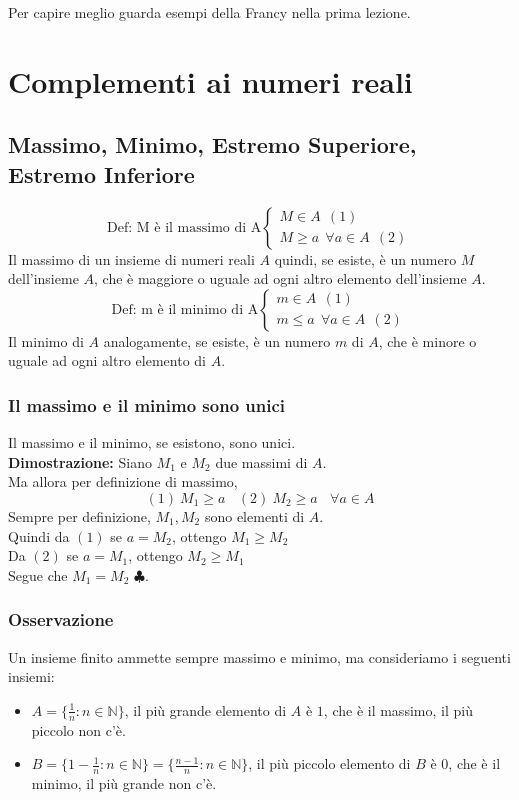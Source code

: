 \documentclass{article}
\begin{document}
Per capire meglio guarda esempi della Francy nella prima lezione.

\section{Complementi ai numeri reali}
\subsection{Massimo, Minimo, Estremo Superiore, Estremo Inferiore}
\[
    \text{Def: M è il massimo di A} \begin{cases}
        M \in A  \ \ (1) \\
        M \geq a \ \ \forall a \in A \ \ (2)
    \end{cases}
\]
Il massimo di un insieme di numeri reali $A$ quindi, se esiste, è un numero $M$
dell'insieme $A$, che è maggiore o uguale ad ogni altro elemento dell'insieme
$A$.
\[
    \text{Def: m è il minimo di A} \begin{cases}
        m \in A  \ \ (1) \\
        m \leq a \ \ \forall a \in A \ \ (2)
    \end{cases}
\]
Il minimo di $A$ analogamente, se esiste, è un numero $m$ di $A$, che è minore
o uguale ad ogni altro elemento di $A$.

\subsubsection{Il massimo e il minimo sono unici}
Il massimo e il minimo, se esistono, sono unici.\\ \textbf{Dimostrazione:}
Siano $M_1$ e $M_2$ due massimi di $A$.\\ Ma allora per definizione di massimo,
\[
    (1) \ M_1 \geq a \ \ \ \ (2) \ M_2 \geq a \ \ \ \ \forall a \in A
\]
Sempre per definizione, $M_1, M_2$ sono elementi di $A$.\\ Quindi da $(1)$ se
$a = M_2$, ottengo $M_1 \geq M_2$\\ Da $(2)$ se $a = M_1$, ottengo $M_2 \geq
    M_1$\\ Segue che $M_1 = M_2$ $\clubsuit$.

\subsubsection{Osservazione}
Un insieme finito ammette sempre massimo e minimo, ma consideriamo i seguenti
insiemi:
\begin{itemize}
    \item $A = \{\frac{1}{n} : n\in \mathbb{N}\}$, il più grande elemento di $A$ è $1$, che è il massimo, il più piccolo non c'è.
    \item $B = \{1-\frac{1}{n} : n\in\mathbb{N}\} = \{\frac{n-1}{n} : n\in\mathbb{N}\}$, il più piccolo elemento di $B$ è $0$, che è il minimo, il più grande non c'è.
\end{itemize}
\end{document}

